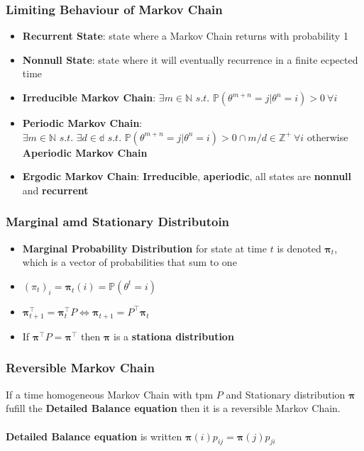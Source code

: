 \documentclass[12pt]{article}
\theoremstyle{definition}
\newcommand{\suchthat}{\textit{ s.t. }}
\newcommand{\Prob}[1]{\mathbb{P}(#1)}
\begin{document}
        \subsubsection*{Limiting Behaviour of Markov Chain}
        \begin{itemize}
            \item \textbf{Recurrent State}: state where a Markov Chain returns with probability 1
            \item \textbf{Nonnull State}: state where it will eventually recurrence in a finite ecpected time
            \item \textbf{Irreducible Markov Chain}: $\exists m \in \mathbb{N} \suchthat \Prob{\theta^{m +n} = j| \theta^n = i} > 0 \ \forall i$
            \item \textbf{Periodic Markov Chain}: $\exists m \in \mathbb{N} \suchthat \exists d \in \mathbb{d} \suchthat \Prob{\theta^{m +n} = j| \theta^n = i} > 0 \cap m/d \in \mathbb{Z^+}  \ \forall i$
                \subitem otherwise \textbf{Aperiodic Markov Chain}
            \item \textbf{Ergodic Markov Chain}: \textbf{Irreducible}, \textbf{aperiodic}, all states are \textbf{nonnull} and \textbf{recurrent}
        \end{itemize}
        \subsubsection*{Marginal amd Stationary Distributoin}
        \begin{itemize}
            \item \textbf{Marginal Probability Distribution} for state at time $t$ is denoted $\bm{\pi}_t$, which is a vector of probabilities that sum to one
            \item $(\pi_t)_i = \bm{\pi}_t(i) = \Prob{\theta^t = i}$
            \item $\bm{\pi}_{t+1}^\top = \bm{\pi}_{t}^\top P \Leftrightarrow \bm{\pi}_{t+1} = P^\top \bm{\pi}_{t}$
            \item If $\bm{\pi}^\top P = \bm{\pi}^\top$ then $\bm{\pi}$ is a \textbf{stationa distribution}
        \end{itemize}
        \subsubsection*{Reversible Markov Chain}
        If a time homogeneous Markov Chain with tpm $P$ and Stationary distribution $\bm{\pi}$ fufill the \textbf{Detailed Balance equation} then it is a reversible Markov Chain.
        \\~\\\textbf{Detailed Balance equation} is written $\bm{\pi}(i)p_{ij} = \bm{\pi}(j)p_{ji}$
\end{document}
